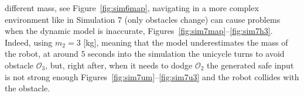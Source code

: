 different mass, see Figure~\ref{fig:sim6map}, navigating in a more complex environment like in Simulation 7 (only obstacles change) can cause problems when the dynamic model is inaccurate, Figures~\ref{fig:sim7map}--\ref{fig:sim7h3}. Indeed, using $m_2=3$ [kg], meaning that the model underestimates the mass of the robot, at around $5$ seconds into the simulation the unicycle turns to avoid obstacle $\mathcal{O}_3$, but, right after, when it needs to dodge $\mathcal{O}_2$ the generated safe input is not strong enough Figures~\ref{fig:sim7um}--\ref{fig:sim7u3} and the robot collides with the obstacle. 
